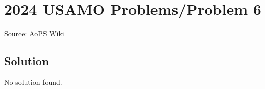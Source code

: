 \documentclass[12pt]{article}
\begin{document}
\section*{{2024 USAMO Problems/Problem 6}}
Source: AoPS Wiki

\subsection*{Solution}
No solution found.
\end{document}
